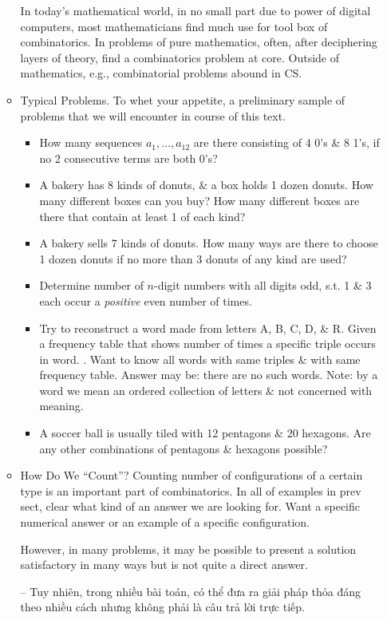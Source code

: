 \documentclass{article}
\begin{document}
\begin{itemize}
\begin{itemize}
		In today's mathematical world, in no small part due to power of digital computers, most mathematicians find much use for tool box of combinatorics. In problems of pure mathematics, often, after deciphering layers of theory, find a combinatorics problem at core. Outside of mathematics, e.g., combinatorial problems abound in CS.
		\item {\sf Typical Problems.} To whet your appetite, a preliminary sample of problems that we will encounter in course of this text.
		\begin{itemize}
			\item How many sequences $a_1,\ldots,a_{12}$ are there consisting of 4 0's \& 8 1's, if no 2 consecutive terms are both 0's?
			\item A bakery has 8 kinds of donuts, \& a box holds 1 dozen donuts. How many different boxes can you buy? How many different boxes are there that contain at least 1 of each kind?
			\item A bakery sells 7 kinds of donuts. How many ways are there to choose 1 dozen donuts if no more than 3 donuts of any kind are used?
			\item Determine number of $n$-digit numbers with all digits odd, s.t. 1 \& 3 each occur a {\it positive} even number of times.
			\item Try to reconstruct a word made from letters A, B, C, D, \& R. Given a frequency table that shows number of times a specific triple occurs in word. {}. Want to know all words with same triples \& with same frequency table. Answer may be: there are no such words. Note: by a word we mean an ordered collection of letters \& not concerned with meaning.
			\item A soccer ball is usually tiled with 12 pentagons \& 20 hexagons. Are any other combinations of pentagons \& hexagons possible?
		\end{itemize}
		\item {\sf How Do We ``Count''?} Counting number of configurations of a certain type is an important part of combinatorics. In all of examples in prev sect, clear what kind of an answer we are looking for. Want a specific numerical answer or an example of a specific configuration.
		
		However, in many problems, it may be possible to present a solution satisfactory in many ways but is not quite a direct answer.
		
		-- Tuy nhiên, trong nhiều bài toán, có thể đưa ra giải pháp thỏa đáng theo nhiều cách nhưng không phải là câu trả lời trực tiếp.
		

\end{itemize}
\end{itemize}
\end{document}
